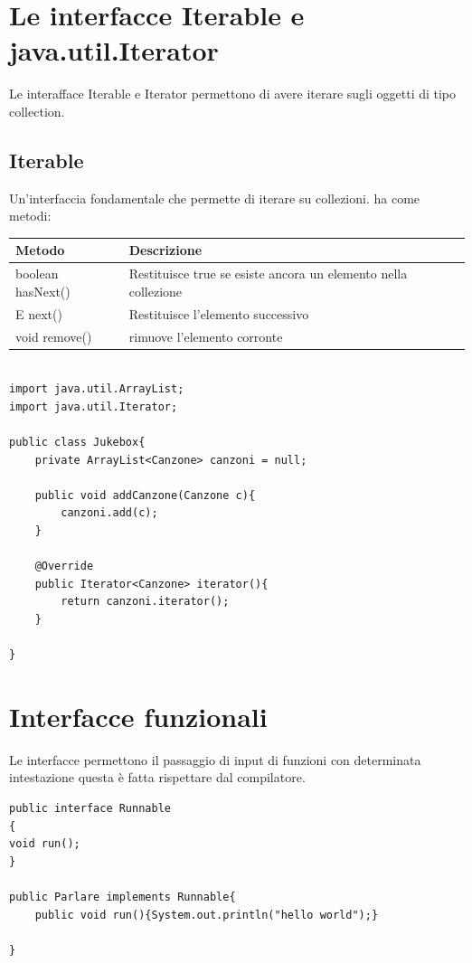 \documentclass[11pt]{article}
\begin{document}
\section{Le interfacce Iterable e java.util.Iterator}
\label{sec:orgcca4b6f}
Le interafface Iterable e Iterator permettono di avere iterare sugli oggetti di tipo collection.
\subsection{Iterable}
\label{sec:org3a38bf7}
Un'interfaccia fondamentale che permette di iterare su collezioni.
ha come metodi:
\begin{center}
\begin{tabular}{ll}
Metodo & Descrizione\\
\hline
boolean hasNext() & Restituisce true se esiste ancora un elemento nella collezione\\
E next() & Restituisce l'elemento successivo\\
void remove() & rimuove l'elemento corronte\\
\hline
\end{tabular}
\end{center}


\begin{verbatim}

import java.util.ArrayList;
import java.util.Iterator;

public class Jukebox{
    private ArrayList<Canzone> canzoni = null;

    public void addCanzone(Canzone c){
        canzoni.add(c);
    }

    @Override
    public Iterator<Canzone> iterator(){
        return canzoni.iterator();
    }

}

\end{verbatim}
\section{Interfacce funzionali}
\label{sec:orgdded629}
Le interfacce permettono il passaggio di input di funzioni con determinata intestazione questa è fatta rispettare dal compilatore.

\begin{verbatim}
public interface Runnable
{
void run();
}

public Parlare implements Runnable{
    public void run(){System.out.println("hello world");}

}
\end{verbatim}
\end{document}
